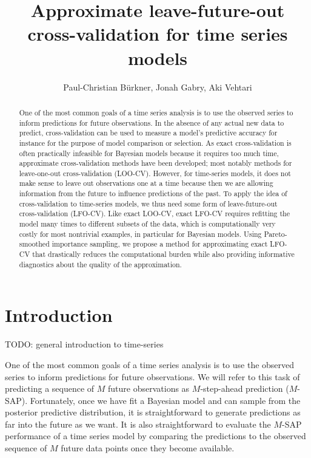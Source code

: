 \documentclass[american,]{article}
\title{Approximate leave-future-out cross-validation for time series models}
\author{Paul-Christian Bürkner, Jonah Gabry, Aki Vehtari}
\date{}
\begin{document}
\maketitle
\begin{abstract}
One of the most common goals of a time series analysis is to use the
observed series to inform predictions for future observations. In the
absence of any actual new data to predict, cross-validation can be used
to measure a model's predictive accuracy for instance for the purpose of
model comparison or selection. As exact cross-validation is often
practically infeasible for Bayesian models because it requires too much
time, approximate cross-validation methods have been developed; most
notably methods for leave-one-out cross-validation (LOO-CV). However,
for time-series models, it does not make sense to leave out observations
one at a time because then we are allowing information from the future
to influence predictions of the past. To apply the idea of
cross-validation to time-series models, we thus need some form of
leave-future-out cross-validation (LFO-CV). Like exact LOO-CV, exact
LFO-CV requires refitting the model many times to different subsets of
the data, which is computationally very costly for most nontrivial
examples, in particular for Bayesian models. Using Pareto-smoothed
importance sampling, we propose a method for approximating exact LFO-CV
that drastically reduces the computational burden while also providing
informative diagnostics about the quality of the approximation.
\end{abstract}

\hypertarget{introduction}{%
\section{Introduction}\label{introduction}}

TODO: general introduction to time-series

One of the most common goals of a time series analysis is to use the
observed series to inform predictions for future observations. We will
refer to this task of predicting a sequence of \(M\) future observations
as \(M\)-step-ahead prediction (\(M\)-SAP). Fortunately, once we have
fit a Bayesian model and can sample from the posterior predictive
distribution, it is straightforward to generate predictions as far into
the future as we want. It is also straightforward to evaluate the
\(M\)-SAP performance of a time series model by comparing the
predictions to the observed sequence of \(M\) future data points once
they become available.
\end{document}

